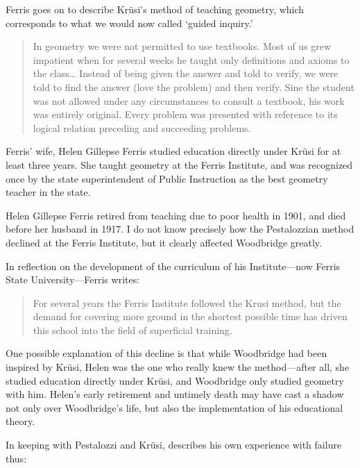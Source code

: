Ferris goes on to describe Krüsi's method of teaching geometry, which corresponds to what we would now called `guided inquiry.'

\begin{quote}

In geometry we were not permitted to use textbooks. Most of us grew impatient when for several weeks he taught only definitions and axioms to the class{\ldots} Instead of being given the answer and told to verify, we were told to find the answer (love the problem) and then verify. Sine the student was not allowed under any circumstances to consult a textbook, his work was entirely original. Every problem was presented with reference to its logical relation preceding and succeeding problems. ~\citep[p. 99]{Ferris:1995tt}
\end{quote}

Ferris' wife, Helen Gillepse Ferris studied education directly under Krüsi for at least three years. She taught geometry at the Ferris Institute, and was recognized once by the state superintendent of Public Instruction as the best geometry teacher in the state. 

Helen Gillepse Ferris retired from teaching due to poor health in 1901, and died before her husband in 1917. I do not know precisely how the Pestalozzian method declined at the Ferris Institute, but it clearly affected Woodbridge greatly.

In reflection on the development of the curriculum of his Institute---now Ferris State University---Ferris writes:

\begin{quote}

For several years the Ferris Institute followed the Krusi method, but the demand for covering more ground in the shortest possible time has driven this school into the field of superficial training. ~\citep[p. 100]{Ferris:1995tt}
\end{quote}

One possible explanation of this decline is that while Woodbridge had been inspired by Krüsi, Helen was the one who really knew the method---after all, she studied education directly under Krüsi, and Woodbridge only studied geometry with him. Helen's early retirement and untimely death may have cast a shadow not only over Woodbridge's life, but also the implementation of his educational theory. 

In keeping with Pestalozzi and Krüsi, describes his own experience with failure thus:

